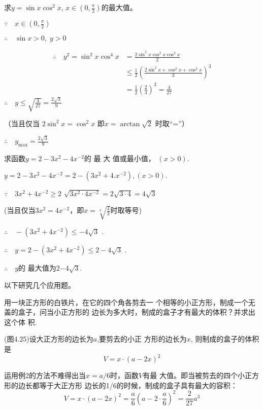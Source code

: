 \begin{example}
    求$y= \sin x\cos ^{2}x$, $x\in \left ( 0, \frac \pi 2\right )$的最大值。
\end{example}

\begin{solution}
    $\because\quad x\in \left ( 0, \frac \pi 2\right )$

$\therefore\quad \sin x>0,\; y>0$

\[\begin{split}
\therefore\quad y^2=\sin^2x\cos^4x&=\frac{2\sin^2x\cos^2x\cos^2x}{2}\\
&\leqslant\frac{1}{2}\left(\frac{2\sin^{2}x+\cos^{2}x+\cos^{2}x}{3}\right)^{3}\\&=\frac{1}{2}\left(\frac{2}{3}\right)^{3}=\frac{4}{27}
\end{split}\]
$\therefore\quad y\leq \sqrt {\frac 4{27}}= \frac {2\sqrt {3}}9$

（当且仅当 $2\sin ^2x= \cos ^2x$ 即$x=\arctan\sqrt{2}$ 时取“=”）

$\therefore\quad y_{\max}=\frac{2\sqrt{3}}{9}$
\end{solution}

\begin{example}
    求函数$y=2-3x^2-4x^{-2}$的 最 大 值或最小值，
$(x>0)$.
\end{example}

\begin{solution}
    $y=2-3x^{2}-4x^{-2}=2-(3x^{2}+4.x^{-2}),(x>0).$

$\because\quad 3x^2+ 4x^{- 2}\geq 2$ $\sqrt {3x^2\cdot 4x^{- 2}}= 2\sqrt {3\cdot 4}= 4\sqrt {3}$ 

(当且仅当$3x^2=4x^{-2}$，即$x=\sqrt[4]{\frac43}$时取等号)

$\therefore\quad - ( 3x^{2}+ 4x^{- 2}) \leqslant - 4\sqrt {3}$ .

$\therefore\quad y= 2- ( 3x^{2}+ 4 x^{- 2}) \leqslant 2- 4\sqrt {3}$ .

$\therefore\quad y$的 最大值为2$-4\sqrt{3}$.
\end{solution}

以下研究几个应用题。

\begin{example}
    用一块正方形的白铁片，在它的四个角各剪去一
个相等的小正方形，制成一个无盖的盒子，问当小正方形的
边长为多大时，制成的盒子才有最大的体积？并求出这个体
积.
\end{example}

\begin{solution}
    (图4.25)设大正方形的边长为$a$,要剪去的小正
方形的边长为$x$, 则制成的盒子的体积是
$$V=x\cdot(a-2x)^{2}$$

运用例2的方法不难得出当$x=a/6$时，函数$V$有最 大值。即当被剪去的四个小正方形的边长都等于大正方形 边长的1/6的时候，制成的盒子具有最大的容积：
$$V=x\cdot(a-2x)^{2}=\frac{a}{6}\left(a-2\cdot\frac{a}{6}\right)^{2}=\frac{2}{27}a^{3}$$
\end{solution}

